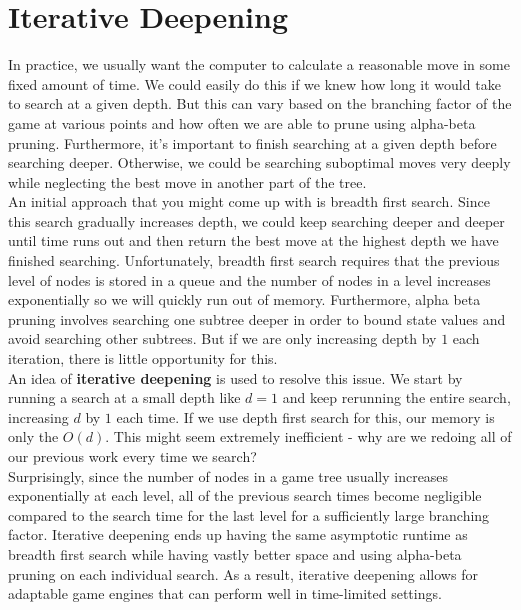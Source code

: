 \documentclass[12pt, letterpaper]{article}
\begin{document}
\section*{Iterative Deepening}
In practice, we usually want the computer to calculate a reasonable move in some fixed amount of time. We could easily do this if we knew how long it would take to search at a given depth. But this can vary based on the branching factor of the game at various points and how often we are able to prune using alpha-beta pruning. Furthermore, it's important to finish searching at a given depth before searching deeper. Otherwise, we could be searching suboptimal moves very deeply while neglecting the best move in another part of the tree. \\[0.2cm]
An initial approach that you might come up with is breadth first search. Since this search gradually increases depth, we could keep searching deeper and deeper until time runs out and then return the best move at the highest depth we have finished searching. Unfortunately, breadth first search requires that the previous level of nodes is stored in a queue and the number of nodes in a level increases exponentially so we will quickly run out of memory. Furthermore, alpha beta pruning involves searching one subtree deeper in order to bound state values and avoid searching other subtrees. But if we are only increasing depth by $1$ each iteration, there is little opportunity for this. \\[0.2cm]
An idea of \textbf{iterative deepening} is used to resolve this issue. We start by running a search at a small depth like $d = 1$ and keep rerunning the entire search, increasing $d$ by $1$ each time. If we use depth first search for this, our memory is only the $O(d)$. This might seem extremely inefficient - why are we redoing all of our previous work every time we search? \\[0.2cm]
Surprisingly, since the number of nodes in a game tree usually increases exponentially at each level, all of the previous search times become negligible compared to the search time for the last level for a sufficiently large branching factor. Iterative deepening ends up having the same asymptotic runtime as breadth first search while having vastly better space and using alpha-beta pruning on each individual search. As a result, iterative deepening allows for adaptable game engines that can perform well in time-limited settings.
\end{document}
